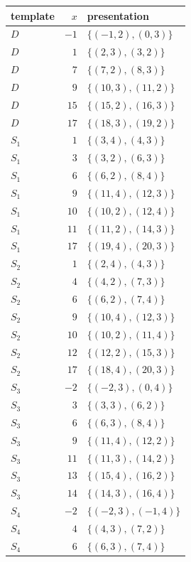 \begin{table}[t]
\centering\small
\begin{tabular}{@{}lrl@{}}
\toprule
template & $x$ & presentation \\
\midrule
$D$ & $-1$ & $\{(-1,2),(0,3)\}$ \\
$D$ & $1$ & $\{(2,3),(3,2)\}$ \\
$D$ & $7$ & $\{(7,2),(8,3)\}$ \\
$D$ & $9$ & $\{(10,3),(11,2)\}$ \\
$D$ & $15$ & $\{(15,2),(16,3)\}$ \\
$D$ & $17$ & $\{(18,3),(19,2)\}$ \\
$S_1$ & $1$ & $\{(3,4),(4,3)\}$ \\
$S_1$ & $3$ & $\{(3,2),(6,3)\}$ \\
$S_1$ & $6$ & $\{(6,2),(8,4)\}$ \\
$S_1$ & $9$ & $\{(11,4),(12,3)\}$ \\
$S_1$ & $10$ & $\{(10,2),(12,4)\}$ \\
$S_1$ & $11$ & $\{(11,2),(14,3)\}$ \\
$S_1$ & $17$ & $\{(19,4),(20,3)\}$ \\
$S_2$ & $1$ & $\{(2,4),(4,3)\}$ \\
$S_2$ & $4$ & $\{(4,2),(7,3)\}$ \\
$S_2$ & $6$ & $\{(6,2),(7,4)\}$ \\
$S_2$ & $9$ & $\{(10,4),(12,3)\}$ \\
$S_2$ & $10$ & $\{(10,2),(11,4)\}$ \\
$S_2$ & $12$ & $\{(12,2),(15,3)\}$ \\
$S_2$ & $17$ & $\{(18,4),(20,3)\}$ \\
$S_3$ & $-2$ & $\{(-2,3),(0,4)\}$ \\
$S_3$ & $3$ & $\{(3,3),(6,2)\}$ \\
$S_3$ & $6$ & $\{(6,3),(8,4)\}$ \\
$S_3$ & $9$ & $\{(11,4),(12,2)\}$ \\
$S_3$ & $11$ & $\{(11,3),(14,2)\}$ \\
$S_3$ & $13$ & $\{(15,4),(16,2)\}$ \\
$S_3$ & $14$ & $\{(14,3),(16,4)\}$ \\
$S_4$ & $-2$ & $\{(-2,3),(-1,4)\}$ \\
$S_4$ & $4$ & $\{(4,3),(7,2)\}$ \\
$S_4$ & $6$ & $\{(6,3),(7,4)\}$ \\
\bottomrule
\end{tabular}
\hspace{1em}

\end{table}
